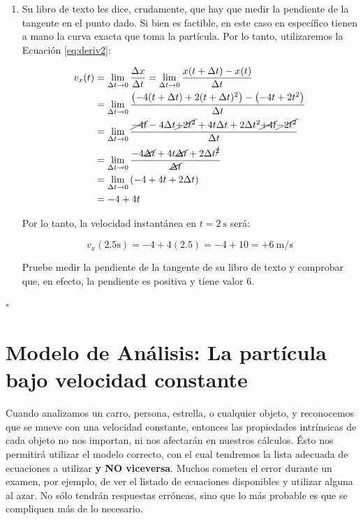 \begin{solution*}
\begin{enumerate}[label=\alph*)]
    \item Su libro de texto les dice, crudamente, que hay que medir la pendiente de la tangente en el punto dado. Si bien es factible, en este caso en espec\'ifico tienen a mano la curva exacta que toma la part\'icula. Por lo tanto, utilizaremos la Ecuaci\'on \ref{eq:deriv2}:
    
    \begin{equation*}
    \begin{split}
        v_{x}(t) &= \lim_{\Delta t\to0} \frac{\Delta x}{\Delta t} = \lim_{\Delta t\to0} \frac{x(t+\Delta t) - x(t)}{\Delta t}\\
        &=\lim_{\Delta t\to0}\frac{\left(-4(t+\Delta t)+2(t+\Delta t)^2\right) - \left(-4t+2t^2\right)}{\Delta t}\\
        &=\lim_{\Delta t\to0}\frac{\cancel{-4t}-4\Delta t\cancel{+2t^2}+4t\Delta t+2\Delta t^2\cancel{+4t}\cancel{-2t^2}}{\Delta t}\\
        &=\lim_{\Delta t\to0}\frac{-4\cancel{\Delta t}+4t\cancel{\Delta t}+2\Delta t^{\cancel{2}}}{\cancel{\Delta t}}\\
        &=\lim_{\Delta t\to0} \left( -4+4t+2\Delta t \right)\\
        &=-4+4t
    \end{split}
    \end{equation*}
    
    Por lo tanto, la velocidad instant\'anea en $t=\SI{2}{\second}$ ser\'a:
    
    \[ v_{x}(2.5\si{\second}) =  -4+4(2.5)=-4+10=+\SI{6}{\meter/\second}\]
    
    Pruebe medir la pendiente de la tangente de su libro de texto y comprobar que, en efecto, la pendiente es positiva y tiene valor 6.

\end{enumerate}

\hfill $\square$
\end{solution*}

\section{Modelo de An\'alisis: La part\'icula bajo velocidad constante}\label{sec:velcte2}

Cuando analizamos un carro, persona, estrella, o cualquier objeto, y reconocemos que se mueve con una velocidad constante, entonces las propiedades intr\'insicas de cada objeto no nos importan, ni nos afectar\'an en nuestros c\'alculos. \'Esto nos permitir\'a utilizar el modelo correcto, con el cual tendremos la lista adecuada de ecuaciones a utilizar \textbf{y NO viceversa}. Muchos cometen el error durante un examen, por ejemplo, de ver el listado de ecuaciones disponibles y utilizar alguna al azar. No s\'olo tendr\'an respuestas err\'oneas, sino que lo m\'as probable es que se compliquen m\'as de lo necesario.

